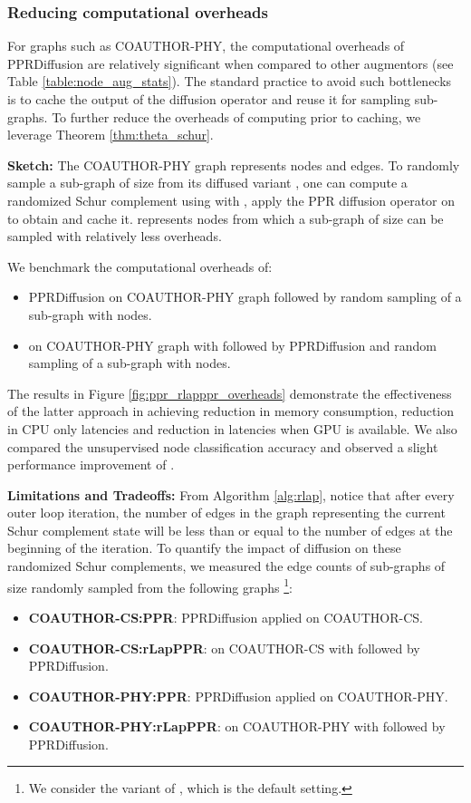 \documentclass{article}
\theoremstyle{plain}
\theoremstyle{definition}
\theoremstyle{remark}
\begin{document}
\subsubsection{Reducing computational overheads}

For graphs such as COAUTHOR-PHY, the computational overheads of PPRDiffusion are relatively significant when compared to other augmentors (see Table \ref{table:node_aug_stats}). The standard practice to avoid such bottlenecks is to cache the output of the diffusion operator  and reuse it for sampling sub-graphs. To further reduce the overheads of computing  prior to caching, we leverage Theorem \ref{thm:theta_schur}.

\textbf{Sketch:} The COAUTHOR-PHY graph  represents  nodes and  edges. To randomly sample a sub-graph of size  from its diffused variant , one can compute a randomized Schur complement  using  with , apply the PPR diffusion operator on  to obtain  and cache it.  represents  nodes from which a sub-graph of size  can be sampled with relatively less overheads.

We benchmark the computational overheads of:

\begin{itemize}
    \item PPRDiffusion on COAUTHOR-PHY graph followed by random sampling of a sub-graph with  nodes.
    \item  on COAUTHOR-PHY graph with  followed by PPRDiffusion and random sampling of a sub-graph with  nodes.
\end{itemize}

The results in Figure \ref{fig:ppr_rlapppr_overheads} demonstrate the effectiveness of the latter approach in achieving  reduction in memory consumption,  reduction in CPU only latencies and  reduction in latencies when GPU is available. We also compared the unsupervised node classification accuracy and observed a slight performance improvement of . 

\textbf{Limitations and Tradeoffs:} From Algorithm \ref{alg:rlap}, notice that after every outer loop iteration, the number of edges in the graph representing the current Schur complement state will be less than or equal to the number of edges at the beginning of the iteration. To quantify the impact of diffusion on these randomized Schur complements, we measured the edge counts of sub-graphs of size  randomly sampled from the following graphs \footnote{We consider the  variant of , which is the default setting. }:

\begin{itemize}
    \item \textbf{COAUTHOR-CS:PPR}: PPRDiffusion applied on COAUTHOR-CS.
    \item \textbf{COAUTHOR-CS:rLapPPR}:  on COAUTHOR-CS with  followed by PPRDiffusion.
    \item \textbf{COAUTHOR-PHY:PPR}: PPRDiffusion applied on COAUTHOR-PHY.
    \item \textbf{COAUTHOR-PHY:rLapPPR}:  on COAUTHOR-PHY with  followed by PPRDiffusion.
\end{itemize}
\end{document}
